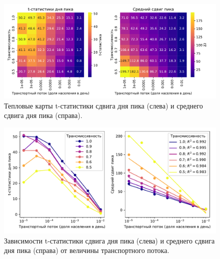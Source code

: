 \documentclass[a4paper,12pt]{article} %
\begin{document}
\begin{figure}[H]
    \centering
    \includegraphics[width=\linewidth]{images/flows_heatmap_conference.pdf}
    \caption{Тепловые карты t-статистики сдвига дня пика (слева) и среднего сдвига дня пика (справа).}
    \label{pic:flows_heatmap_conference}
\end{figure}

\begin{figure}[H]
    \centering
    \includegraphics[width=\linewidth]{images/flows_lines.pdf}
    \caption{Зависимости t-статистики сдвига дня пика (слева) и среднего сдвига дня пика (справа) от величины транспортного потока.}
    \label{pic:flows_lines}
\end{figure}
\end{document}
